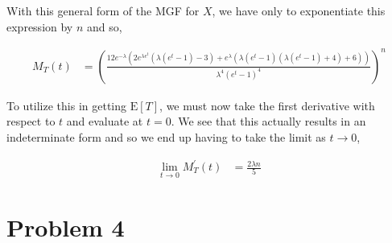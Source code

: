 \documentclass[11pt]{article}
\begin{document}
With this general form of the MGF for $X$, we have only to
exponentiate this expression by $n$ and so,


\begin{align*}
  M_T(t) &= \left( \frac{12 e^{-\lambda } \left(2 e^{\lambda  e^t}
           \left(\lambda \left(e^t-1\right)-3\right)+e^{\lambda}
           \left(\lambda \left(e^t-1\right) \left(\lambda
           \left(e^t-1\right)+4\right)+6\right)\right)}{\lambda^4
           \left(e^t-1\right)^4} \right)^n
\end{align*}

To utilize this in getting $\mathrm{E}[T]$, we must now take the first
derivative with respect to $t$ and evaluate at $t=0$.  We see that
this actually results in an indeterminate form and so we end up having
to take the limit as $t \rightarrow 0$,

\begin{align*}
  \lim_{t \rightarrow 0} M_T^{'}(t) &= \frac{2\lambda n}{5}
\end{align*}

\section*{Problem 4}
\end{document}
